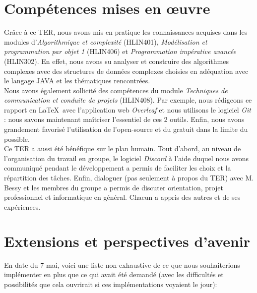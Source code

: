 \documentclass[11pt,a4paper]{article}
\begin{document}
\section{Compétences mises en œuvre}

    Grâce à ce TER, nous avons mis en pratique les connaissances acquises dans les modules d'\textit{Algorithmique et complexité} (HLIN401), \textit{Modélisation et programmation par objet 1} (HLIN406) et \textit{Programmation impérative avancée} (HLIN302). En effet, nous avons su analyser et construire des algorithmes complexes avec des structures de données complexes choisies en adéquation avec le langage JAVA et les thématiques rencontrées.\\
    
    Nous avons également sollicité des compétences du module \textit{Techniques de communication et conduite de projets} (HLIN408). Par exemple, nous rédigeons ce rapport en \LaTeX~avec l'application web \textit{Overleaf} et nous utilisons le logiciel \textit{Git} : nous savons maintenant maîtriser l'essentiel de ces 2 outils. Enfin, nous avons grandement favorisé l'utilisation de l'open-source et du gratuit dans la limite du possible.\\
    
    Ce TER a aussi été bénéfique sur le plan humain. Tout d'abord, au niveau de l'organisation du travail en groupe, le logiciel \textit{Discord} à l'aide duquel nous avons communiqué pendant le développement a permis de faciliter les choix et la répartition des tâches. Enfin, dialoguer (pas seulement à propos du TER) avec M. Bessy et les membres du groupe a permis de discuter orientation, projet professionnel et informatique en général. Chacun a appris des autres et de ses expériences.

\newpage

\section{Extensions et perspectives d'avenir}

    En date du 7 mai, voici une liste non-exhaustive de ce que nous souhaiterions implémenter en plus que ce qui avait été demandé (avec les difficultés et possibilités que cela ouvrirait si ces implémentations voyaient le jour):\\
    
\end{document}
